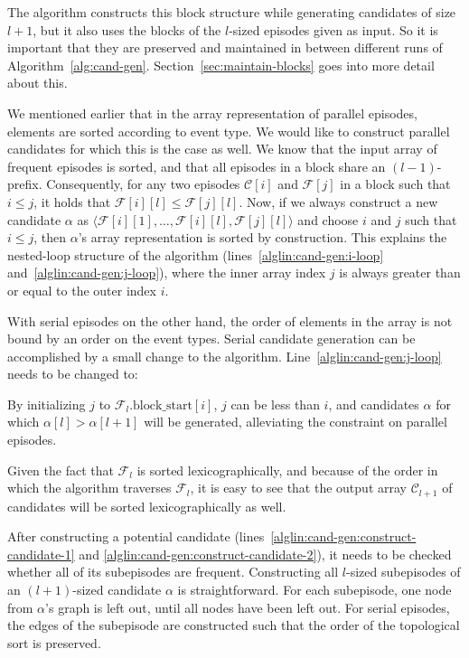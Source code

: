 The algorithm constructs this block structure while generating candidates of size $ l + 1 $, but it also uses the blocks of the $ l $-sized episodes given as input. So it is important that they are preserved and maintained in between different runs of Algorithm~\ref{alg:cand-gen}. Section~\ref{sec:maintain-blocks} goes into more detail about this.

We mentioned earlier that in the array representation of parallel episodes, elements are sorted according to event type. We would like to construct parallel candidates for which this is the case as well. We know that the input array of frequent episodes is sorted, and that all episodes in a block share an $ (l - 1) $-prefix. Consequently, for any two episodes $ \mathcal{C}[i] $ and $ \mathcal{F}[j] $ in a block such that $ i \leq j $, it holds that $ \mathcal{F}[i][l] \leq \mathcal{F}[j][l] $.
Now, if we always construct a new candidate $ \alpha $ as $ \langle \mathcal{F}[i][1], \ldots,\allowbreak\mathcal{F}[i][l],\allowbreak\mathcal{F}[j][l] \rangle $ and choose $ i $ and $ j $ such that $ i \leq j $, then $ \alpha $'s array representation is sorted by construction. This explains the nested-loop structure of the algorithm (lines~\ref{alglin:cand-gen:i-loop} and~\ref{alglin:cand-gen:j-loop}), where the inner array index $ j $ is always greater than or equal to the outer index $ i $.

With serial episodes on the other hand, the order of elements in the array is not bound by an order on the event types.
Serial candidate generation can be accomplished by a small change to the algorithm. Line~\ref{alglin:cand-gen:j-loop} needs to be changed to:
\begin{algorithmic}[0]
\EndFor
\end{algorithmic}
By initializing $ j $ to $ \mathcal{F}_l \text{.block\_start}[i] $, $ j $ can be less than $ i $, and candidates $ \alpha $ for which $ \alpha[l] > \alpha[l + 1] $ will be generated, alleviating the constraint on parallel episodes.

Given the fact that $ \mathcal{F}_l $ is sorted lexicographically, and because of the order in which the algorithm traverses $ \mathcal{F}_l $, it is easy to see that the output array $ \mathcal{C}_{l + 1} $ of candidates will be sorted lexicographically as well.

After constructing a potential candidate (lines~\ref{alglin:cand-gen:construct-candidate-1} and \ref{alglin:cand-gen:construct-candidate-2}), it needs to be checked whether all of its subepisodes are frequent.
Constructing all $ l $-sized subepisodes of an $ (l + 1) $-sized candidate $ \alpha $ is straightforward. For each subepisode, one node from $ \alpha $'s graph is left out, until all nodes have been left out. For serial episodes, the edges of the subepisode are constructed such that the order of the topological sort is preserved.

